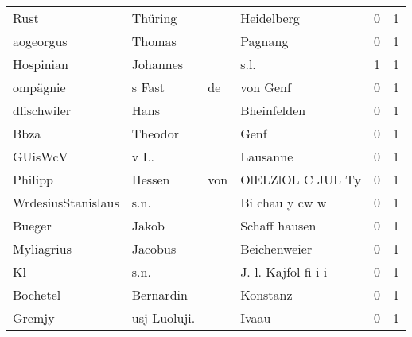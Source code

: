\begin{tabular}{llllrr}
                     Rust &                            Thüring &             &                                  Heidelberg &          0 &         1 \\
                aogeorgus &                             Thomas &             &                                     Pagnang &          0 &         1 \\
                Hospinian &                           Johannes &             &                                        s.l. &          1 &         1 \\
                 ompägnie &                             s Fast &          de &                                    von Genf &          0 &         1 \\
              dlischwiler &                               Hans &             &                                 Bheinfelden &          0 &         1 \\
                     Bbza &                            Theodor &             &                                        Genf &          0 &         1 \\
                  GUisWcV &                               v L. &             &                                    Lausanne &          0 &         1 \\
                  Philipp &                             Hessen &         von &                           OlELZlOL C JUL Ty &          0 &         1 \\
       WrdesiusStanislaus &                               s.n. &             &                              Bi chau y cw w &          0 &         1 \\
                   Bueger &                              Jakob &             &                               Schaff hausen &          0 &         1 \\
               Myliagrius &                            Jacobus &             &                                Beichenweier &          0 &         1 \\
                       Kl &                               s.n. &             &                         J. l. Kajfol fi i i &          0 &         1 \\
                 Bochetel &                          Bernardin &             &                                    Konstanz &          0 &         1 \\
                   Gremjy &                       usj Luoluji. &             &                                       Ivaau &          0 &         1 \\

\end{tabular}
